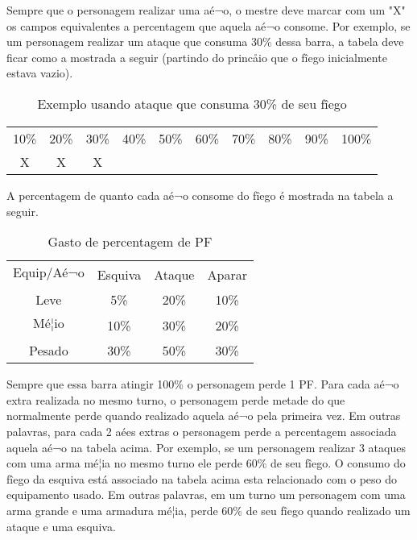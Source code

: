Sempre que o personagem realizar uma aé¬o, o mestre deve marcar com um "X" os campos equivalentes a percentagem que aquela aé¬o consome. Por exemplo, se um personagem realizar um ataque que consuma 30\% dessa barra, a tabela deve ficar como a mostrada a seguir (partindo do princåio que o fîego inicialmente estava vazio). 
  

\begin{table}[htbp]
\begin{center}
\begin{tabular}{|c|c|c|c|c|c|c|c|c|c|} \hline 
10\%&	 20\%&	30\%&	 40\%&	 50\%&	 60\%&	 70\%&	 80\%&	 90\%&	 100\%\\\cline{1-10} 
X &X  &X   & &  &  &  &  &   &  
\\ \hline
\end{tabular}
\end{center}
\caption{Exemplo usando ataque que consuma 30\% de seu fîego}
\label{}
\end{table}

A percentagem de quanto cada aé¬o consome do fîego é mostrada na tabela a seguir.

\begin{table}[htbp]
\begin{center}
\begin{tabular}{|c|c|c|c|} \hline 
Equip/Aé¬o &	 Esquiva &	Ataque&	 Aparar\\\cline{1-4} 
Leve & 5\%  & 20\%   &  10\% \\\cline{1-4} 
Mé¦io & 10\%  & 30\%   &  20\% \\\cline{1-4} 
Pesado & 30\%  & 50\%   &  30\%  
\\ \hline
\end{tabular}
\end{center}
\caption{Gasto de percentagem de PF}
\label{}
\end{table}


Sempre que essa barra atingir 100\% o personagem perde 1 PF. Para cada aé¬o extra realizada no mesmo turno, o personagem perde metade do que normalmente perde quando realizado aquela aé¬o pela primeira vez. Em outras palavras, para cada 2 aées extras o personagem perde a percentagem associada aquela aé¬o na tabela acima. Por exemplo, se um personagem realizar 3 ataques com uma arma mé¦ia no mesmo turno ele perde 60\% de seu fîego. O consumo do fîego da esquiva está associado na tabela acima esta relacionado com o peso do equipamento usado. Em outras palavras, em um turno um personagem com uma arma grande e uma armadura mé¦ia, perde 60\% de seu fîego quando realizado um ataque e uma esquiva. 

